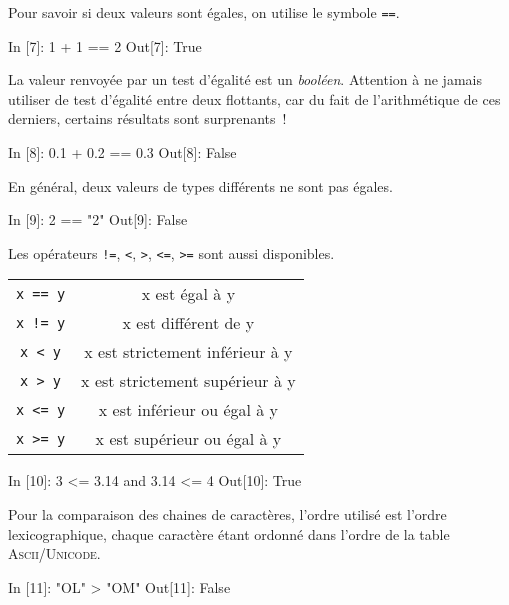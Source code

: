 \documentclass{magnoliaold}
\begin{document}
Pour savoir si deux valeurs sont égales, on utilise le symbole \og\verb_==_\fg.

\begin{pythoncode}
In [7]: 1 + 1 == 2
Out[7]: True
\end{pythoncode}

\noindent La valeur renvoyée par un test d'égalité est un \emph{booléen}. Attention
à ne jamais utiliser de test d'égalité entre deux flottants, car du fait de l'arithmétique
de ces derniers, certains résultats sont surprenants~!

\begin{pythoncode}
In [8]: 0.1 + 0.2 == 0.3
Out[8]: False
\end{pythoncode}

En général, deux valeurs de types différents ne sont pas égales.
\begin{pythoncode}
In [9]: 2 == "2"
Out[9]: False
\end{pythoncode}
\noindent
Les opérateurs \verb_!=_, \verb_<_, \verb_>_, \verb_<=_, \verb_>=_ sont aussi disponibles.

\begin{center}
\begin{tabular}{cc}
\hline
\verb_x == y_& x est égal à y\\
\verb_x != y_ & x est différent de y\\
\verb_x < y_ & x est strictement inférieur à y\\
\verb_x > y_ & x est strictement supérieur à y\\
\verb_x <= y_ & x est inférieur ou égal à y\\
\verb_x >= y_ & x est supérieur ou égal à y\\
\hline
\end{tabular}
\end{center}

\begin{pythoncode}
In [10]: 3 <= 3.14 and 3.14 <= 4
Out[10]: True
\end{pythoncode}



Pour la comparaison des chaines de caractères, l'ordre utilisé est l'ordre
lexicographique, chaque caractère étant ordonné dans l'ordre de la table
\textsc{Ascii}/\textsc{Unicode}.

\begin{pythoncode}
In [11]: "OL" > "OM"
Out[11]: False
\end{pythoncode}
\end{document}
